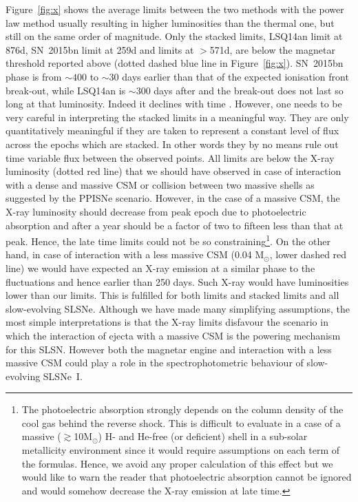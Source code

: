 \documentclass[useAMS,usenatbib]{mn2e}
\def\M{M$_{\odot}$}
\def\an{LSQ14an}
\begin{document}
Figure~\ref{fig:x} shows the average limits between the two methods with the power law method usually resulting in higher luminosities than the thermal one, but still on the same order of magnitude. Only the stacked limits, \an\/ limit at 876d, SN~2015bn limit at 259d and limits at $>$571d, are below the magnetar threshold reported above (dotted dashed blue line in Figure~\ref{fig:x}). SN~2015bn phase is from $\sim400$ to $\sim$30 days earlier than that of the expected ionisation front break-out, while \an\/ is $\sim300$ days after and the break-out does not last so long at that luminosity. Indeed it declines with time \citep[see][]{me14}. 
However, one needs to be very careful in interpreting the stacked limits in a meaningful way. They are only 
quantitatively meaningful if they are taken to represent a constant level of flux across the epochs which are stacked. In 
other words they by no means rule out time variable flux between the observed points. 
All limits are below the X-ray luminosity (dotted red line) that we should have observed in case of interaction with a dense and massive CSM or collision between two massive shells as suggested by the PPISNe scenario. However, in the case of a massive CSM, the X-ray luminosity should decrease from peak epoch due to photoelectric absorption \citep{ch03} and after a year should be a factor of two to fifteen less than that at peak. Hence, the late time limits could not be so constraining\footnote{The photoelectric absorption strongly depends on the column density of the cool gas behind the reverse shock. This is difficult to evaluate in a case of a massive ($\gtrsim$10\M) H- and He-free (or deficient) shell in a sub-solar metallicity environment since it would require assumptions on each term of the formulas. Hence, we avoid any proper calculation of this effect but we would like to warn the reader that photoelectric absorption cannot be ignored and would somehow decrease the X-ray emission at late time.}. On the other hand, in case of interaction with a less massive CSM (0.04 \M, lower dashed red line) we would have expected an X-ray emission at a similar phase to the fluctuations and hence earlier than 250 days. Such X-ray would have luminosities lower than our limits. This is fulfilled for both limits and stacked limits and all slow-evolving SLSNe. Although we have made many simplifying assumptions, 
the most simple interpretations is that the 
X-ray limits  disfavour the scenario in which the interaction of ejecta 
with a massive CSM is the powering mechanism for this SLSN. 
However both the magnetar engine and interaction with a less massive CSM could play a role in the spectrophotometric behaviour of slow-evolving SLSNe~I.
\end{document}
